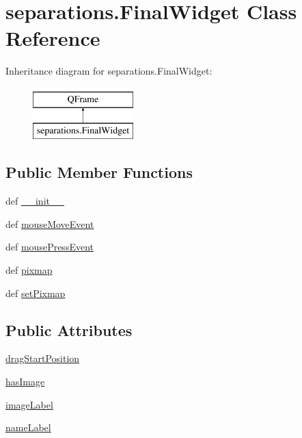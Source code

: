 \hypertarget{classseparations_1_1FinalWidget}{}\section{separations.\+Final\+Widget Class Reference}
\label{classseparations_1_1FinalWidget}
Inheritance diagram for separations.\+Final\+Widget\+:\begin{figure}[H]
\begin{center}
\leavevmode
\includegraphics[height=2.000000cm]{classseparations_1_1FinalWidget}
\end{center}
\end{figure}
\subsection*{Public Member Functions}
\begin{DoxyCompactItemize}
\item 
def \hyperlink{classseparations_1_1FinalWidget_a772f3bd5bd83608d12bb4afc114e9cbe}{\+\_\+\+\_\+init\+\_\+\+\_\+}
\item 
def \hyperlink{classseparations_1_1FinalWidget_aacda7c81b9eea00d7b0961d54d87c3f3}{mouse\+Move\+Event}
\item 
def \hyperlink{classseparations_1_1FinalWidget_a34ae3861f02c3927616a8205d1d7beab}{mouse\+Press\+Event}
\item 
def \hyperlink{classseparations_1_1FinalWidget_a14dd87ac0db34b039fb24a40177244f4}{pixmap}
\item 
def \hyperlink{classseparations_1_1FinalWidget_a9f369176c622ae5a090267483b1cb8f6}{set\+Pixmap}
\end{DoxyCompactItemize}
\subsection*{Public Attributes}
\begin{DoxyCompactItemize}
\item 
\hyperlink{classseparations_1_1FinalWidget_a66a50b6f531bdb92db71110625b71939}{drag\+Start\+Position}
\item 
\hyperlink{classseparations_1_1FinalWidget_a45d4d76e9372d9d8e154c942ab7259e6}{has\+Image}
\item 
\hyperlink{classseparations_1_1FinalWidget_a8d2a26fc581eb0a39604f7abc9e0c2aa}{image\+Label}
\item 
\hyperlink{classseparations_1_1FinalWidget_a8fc94a74cc2519d45b01059d59c63e66}{name\+Label}
\end{DoxyCompactItemize}


